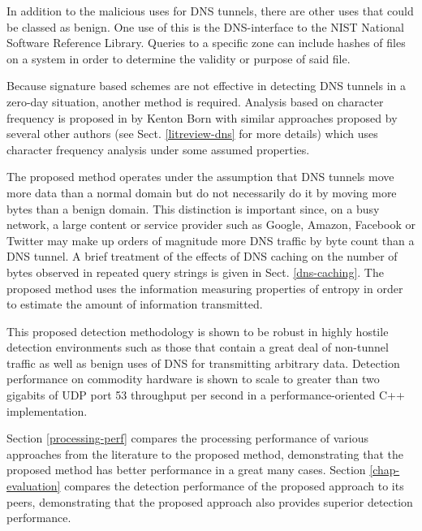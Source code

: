\documentclass{llncs}
\begin{document}
In addition to the malicious uses for DNS tunnels, there are other uses that
could be classed as benign. One use of this is the DNS-interface to the NIST
National Software Reference Library\cite{sans-dnshash}. Queries to a specific
zone can include hashes of files on a system in order to determine the validity
or purpose of said file. 

Because signature based schemes are not effective in detecting DNS tunnels in a
zero-day situation, another method is required. Analysis based on character
frequency is proposed in\cite{Born2010.cfa} by Kenton Born with similar
approaches proposed by several other authors (see Sect. \ref{litreview-dns}
for more details) which uses character frequency analysis under some assumed
properties.

The proposed method operates under the assumption that DNS tunnels move more
data than a normal domain but do not necessarily do it by moving more bytes than
a benign domain. This distinction is important since, on a busy network, a large
content or service provider such as Google, Amazon, Facebook or Twitter may make
up orders of magnitude more DNS traffic by byte count than a DNS tunnel. A brief
treatment of the effects of DNS caching on the number of bytes observed in
repeated query strings is given in Sect. \ref{dns-caching}. The proposed method uses the information
measuring properties of entropy in order to estimate the amount of information
transmitted.

This proposed detection methodology is shown to 
be robust
in highly hostile detection environments such as those that contain a great deal
of non-tunnel traffic as well as benign uses of DNS for transmitting arbitrary
data. Detection performance on commodity hardware is shown to scale to greater
than two gigabits of UDP port 53 throughput per second in a performance-oriented
C++ implementation.

Section \ref{processing-perf} compares the processing performance of various
approaches from the literature to the proposed method, demonstrating that the
proposed method has better performance in a great many cases. Section
\ref{chap-evaluation} compares the detection performance of the proposed
approach to its peers, demonstrating that
the proposed approach also provides superior detection performance.
\end{document}
